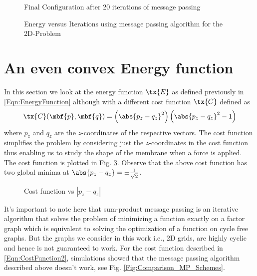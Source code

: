 \documentclass[journal, onecolumn]{IEEEtran}
\begin{document}
\begin{figure}[h!]
\centering

\caption{Final Configuration after 20 iterations of message passing }
\label{Fig:2D_FinalConfig}
\end{figure}

\begin{figure}[h!]
\centering

\caption{Energy versus Iterations using message passing algorithm for the 2D-Problem}
\label{Fig:Energy_vs_Iterations1}
\end{figure}

\section{An even convex Energy function}
In this section we look at the energy function $\tx{E}$ as defined previously in \eqref{Eqn:EnergyFunction} although with a different  cost function $\tx{C}$ defined as
\begin{equation}
\tx{C}(\mbf{p},\mbf{q})=\left(\abs{p_{z}-q_{z}}^{2}\right) \left(\abs{p_{z}-q_{z}}^{2}-1\right)
\label{Eqn:CostFunction2}
\end{equation}
where $p_{z}$ and $q_{z}$ are the $z$-coordinates of the respective vectors. The cost function simplifies the problem by considering just the $z$-coordinates in the cost function thus enabling us to study the shape of the membrane when a force is applied. The cost function is plotted in Fig. \ref{Fig:CostFunction2}. Observe that the above cost function has two global minima at $\abs{p_{z}-q_{z}}=\pm \frac{1}{\sqrt{2}}$.
\begin{figure}[h!]
\centering
{}
\caption{Cost function vs $|p_{z}-q_{z}|$}
\label{Fig:CostFunction2}
\end{figure}

It's important to note here that sum-product message passing is an iterative algorithm that solves the problem of minimizing a function exactly on a factor graph which is equivalent to solving the optimization of a function on cycle free graphs. But the graphs we consider in this work i.e., 2D grids, are highly cyclic and hence is not guaranteed to work. For the cost function described in \eqref{Eqn:CostFunction2}, simulations showed that the message passing algorithm described above doesn't work, see Fig. \ref{Fig:Comparison_MP_Schemes}.
\end{document}
